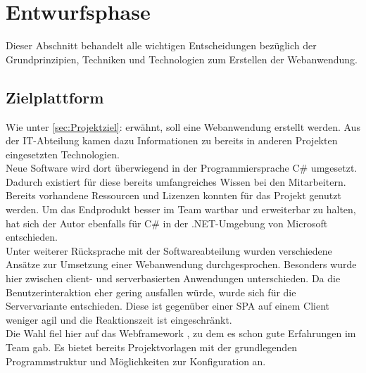 \section{Entwurfsphase} 
\label{sec:Entwurfsphase}
Dieser Abschnitt behandelt alle wichtigen Entscheidungen bezüglich der Grundprinzipien, Techniken und Technologien zum
Erstellen der Webanwendung.

\subsection{Zielplattform}
\label{sec:Zielplattform}
Wie unter \ref{sec:Projektziel}:  erwähnt, soll eine
Webanwendung erstellt werden. Aus der IT-Abteilung kamen dazu Informationen zu bereits 
in anderen Projekten eingesetzten Technologien.\\
Neue Software wird dort überwiegend in der Programmiersprache C\# umgesetzt. 
Dadurch existiert für diese bereits umfangreiches Wissen bei den Mitarbeitern.
Bereits vorhandene Ressourcen und Lizenzen konnten für das Projekt genutzt werden.
Um das Endprodukt besser im Team wartbar und erweiterbar zu halten, hat sich der Autor 
ebenfalls für C\# in der .NET-Umgebung von Microsoft entschieden.\\
Unter weiterer Rücksprache mit der Softwareabteilung wurden verschiedene Ansätze zur
Umsetzung einer Webanwendung durchgesprochen. Besonders wurde hier zwischen client- und serverbasierten
Anwendungen unterschieden. Da die Benutzerinteraktion eher gering ausfallen würde, wurde sich
für die Servervariante entschieden. Diese ist gegenüber einer \ac{SPA} auf einem Client weniger agil und die 
Reaktionszeit ist eingeschränkt.\\
Die Wahl fiel hier auf das Webframework , zu dem es schon gute Erfahrungen im Team gab.
Es bietet bereits Projektvorlagen mit der grundlegenden Programmstruktur und Möglichkeiten zur
Konfiguration an. 


